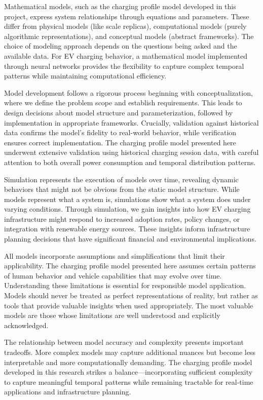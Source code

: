 Mathematical models, such as the charging profile model developed in this project, express system relationships through equations and parameters. These differ from physical models (like scale replicas), computational models (purely algorithmic representations), and conceptual models (abstract frameworks). The choice of modeling approach depends on the questions being asked and the available data. For EV charging behavior, a mathematical model implemented through neural networks provides the flexibility to capture complex temporal patterns while maintaining computational efficiency.

Model development follows a rigorous process beginning with conceptualization, where we define the problem scope and establish requirements. This leads to design decisions about model structure and parameterization, followed by implementation in appropriate frameworks. Crucially, validation against historical data confirms the model's fidelity to real-world behavior, while verification ensures correct implementation. The charging profile model presented here underwent extensive validation using historical charging session data, with careful attention to both overall power consumption and temporal distribution patterns.

Simulation represents the execution of models over time, revealing dynamic behaviors that might not be obvious from the static model structure. While models represent what a system is, simulations show what a system does under varying conditions. Through simulation, we gain insights into how EV charging infrastructure might respond to increased adoption rates, policy changes, or integration with renewable energy sources. These insights inform infrastructure planning decisions that have significant financial and environmental implications.

All models incorporate assumptions and simplifications that limit their applicability. The charging profile model presented here assumes certain patterns of human behavior and vehicle capabilities that may evolve over time. Understanding these limitations is essential for responsible model application. Models should never be treated as perfect representations of reality, but rather as tools that provide valuable insights when used appropriately. The most valuable models are those whose limitations are well understood and explicitly acknowledged.

The relationship between model accuracy and complexity presents important tradeoffs. More complex models may capture additional nuances but become less interpretable and more computationally demanding. The charging profile model developed in this research strikes a balance—incorporating sufficient complexity to capture meaningful temporal patterns while remaining tractable for real-time applications and infrastructure planning.

